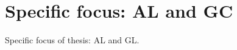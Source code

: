 \section{Specific focus: AL and GC}
\label{sec:visualizer:focus}

Specific focus of thesis: AL and GL.